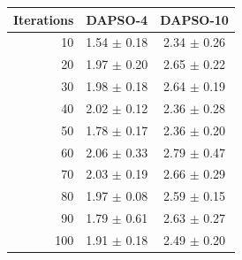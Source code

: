 \begin{tabular}{rcc}
\hline
Iterations & DAPSO-4 & DAPSO-10 \\
\hline
10 & 1.54 $\pm$ 0.18 & 2.34 $\pm$ 0.26 \\
20 & 1.97 $\pm$ 0.20 & 2.65 $\pm$ 0.22 \\
30 & 1.98 $\pm$ 0.18 & 2.64 $\pm$ 0.19 \\
40 & 2.02 $\pm$ 0.12 & 2.36 $\pm$ 0.28 \\
50 & 1.78 $\pm$ 0.17 & 2.36 $\pm$ 0.20 \\
60 & 2.06 $\pm$ 0.33 & 2.79 $\pm$ 0.47 \\
70 & 2.03 $\pm$ 0.19 & 2.66 $\pm$ 0.29 \\
80 & 1.97 $\pm$ 0.08 & 2.59 $\pm$ 0.15 \\
90 & 1.79 $\pm$ 0.61 & 2.63 $\pm$ 0.27 \\
100 & 1.91 $\pm$ 0.18 & 2.49 $\pm$ 0.20 \\
\hline
\end{tabular}